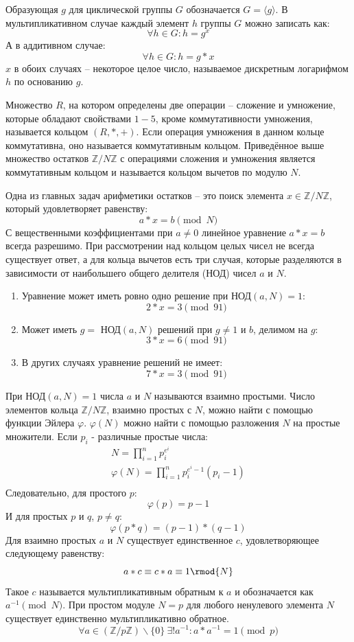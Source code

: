\documentclass[times,specification,annotation]{itmo-student-thesis}
\begin{document}
Образующая $g$ для циклической группы $G$ обозначается $G=\langle g \rangle$.
В мультипликативном случае каждый элемент $h$ группы $G$ можно записать как:
\[\forall h \in G: h=g^x\]
А в аддитивном случае:
\[\forall h \in G: h=g*x\]
$x$ в обоих случаях -- некоторое целое число, называемое дискретным логарифмом $h$ по основанию $g$.

Множество $R$, на котором определены две операции -- сложение и умножение, которые обладают свойствами
$1-5$, кроме коммутативности умножения, называется кольцом $(R,*,+)$.
Если операция умножения в данном кольце коммутативна, оно называется коммутативным кольцом.
Приведённое выше множество остатков $\mathbb{Z}/N\mathbb{Z}$ с операциями сложения и умножения
является коммутативным кольцом и называется кольцом вычетов по модулю $N$.

Одна из главных задач арифметики остатков -- это поиск элемента $x\in\mathbb{Z}/N\mathbb{Z}$, который удовлетворяет равенству:
\[a*x=b\pmod{N}\]
С вещественными коэффициентами при $a \neq 0$ линейное уравнение $a*x=b$ всегда разрешимо.
При рассмотрении над кольцом целых чисел не всегда существует ответ, а для кольца вычетов есть три случая,
которые разделяются в зависимости от наибольшего общего делителя (НОД) чисел $a$ и $N$.
\begin{enumerate}[label=\arabic*.]
    \item Уравнение может иметь ровно одно решение при НОД$(a,N) = 1$:
    \[2*x=3\pmod{91}\]
    \item Может иметь $g = $ НОД$(a,N)$ решений при $g \neq 1$ и $b$, делимом на $g$:
    \[3*x=6\pmod{91}\]
    \item В других случаях уравнение решений не имеет:
    \[7*x=3\pmod{91}\]
\end{enumerate}

При НОД$(a,N) = 1$ числа $a$ и $N$ называются взаимно простыми.
Число элементов кольца $\mathbb{Z}/N\mathbb{Z}$, взаимно простых с $N$, можно найти с помощью функции Эйлера $\varphi$.
$\varphi(N)$ можно найти с помощью разложения $N$ на простые множители.
Если $p_i$ - различные простые числа:
\begin{gather*}
    N = \prod_{i=1}^n p_i^{e^i}\\
    \varphi(N) = \prod_{i=1}^n p_i^{e^i-1}(p_i-1)\\
\end{gather*}
Следовательно, для простого $p$:
\[\varphi(p) = p-1\]
И для простых $p$ и $q$, $p \neq q$:
\[\varphi(p*q) = (p-1)*(q-1)\]
Для взаимно простых $a$ и $N$ существует единственное $c$, удовлетворяющее следующему равенству:
\[a*c \equiv c*a \equiv 1 \rmod{N}\]
Такое $c$ называется мультипликативным обратным к $a$ и обозначается как $a^{-1} \pmod{N}$.
При простом модуле $N=p$ для любого ненулевого элемента $N$ существует единственно мультипликативно обратное.
\[ \forall a \in (\mathbb{Z}/p\mathbb{Z}) \backslash \{0\} ~ \exists! a^{-1}: a*a^{-1} = 1 \pmod{p}\]
\end{document}

